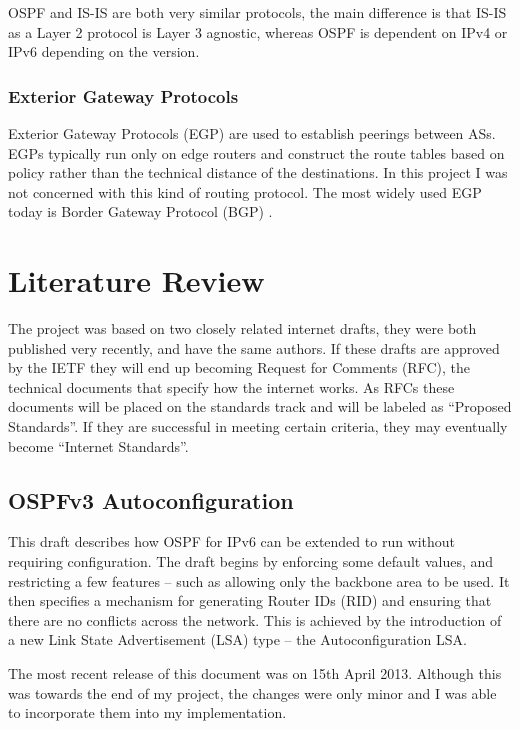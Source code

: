 \documentclass[12pt,a4paper,twoside]{report}
\begin{document}
OSPF and IS-IS are both very similar protocols, the main difference is that
IS-IS as a Layer 2 protocol is Layer 3 agnostic, whereas OSPF is dependent on
IPv4 or IPv6 depending on the version.

\subsection{Exterior Gateway Protocols}
Exterior Gateway Protocols (EGP) 
are used to establish peerings between ASs. EGPs typically run only on edge
routers and construct the route tables based on policy rather than the
technical distance of the destinations. In this project I was not concerned
with this kind of routing protocol.  The most widely used EGP today is Border
Gateway Protocol (BGP) .

\chapter{Literature Review} 
The project was based on two closely related internet drafts, they were both
published very recently, and have the same authors. If these drafts are
approved by the IETF they will end up becoming Request for Comments
(RFC), the technical documents that
specify how the internet works. As RFCs these documents will be placed on the
standards track and will be labeled as ``Proposed Standards''. If they are
successful in meeting certain criteria, they may eventually become ``Internet
Standards''\cite{rfc6410}.

\section{OSPFv3 Autoconfiguration}
This draft\cite{draft-ietf-ospf-ospfv3-autoconfig-02} describes how OSPF for
IPv6 can be extended to run without requiring configuration. The draft begins
by enforcing some default values, and restricting a few features -- such as
allowing only the backbone area to be used. It then specifies a mechanism for
generating Router IDs (RID)  and ensuring that
there are no conflicts across the network. This is achieved by the introduction
of a new Link State Advertisement (LSA)  type -- the Autoconfiguration LSA. 

The most recent release of this document was on 15th April 2013. Although this
was towards the end of my project, the changes were only minor and I was able
to incorporate them into my implementation.
\end{document}
